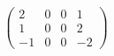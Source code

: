 \documentclass{mc2013}
\newcommand\bs{\boldsymbol}
\newcommand\tf{\varphi}
\renewcommand{\(}{\left(}
\renewcommand{\)}{\right)}
\renewcommand{\[}{\left[}
\renewcommand{\]}{\right]}
\begin{document}
\begin{itemize}
\begin{equation}
\begin{split}
\begin{pmatrix}
2 & 0 & 0 & 1 \\
1 & 0 & 0 & 2 \\
-1 & 0 & 0 & -2
\end{pmatrix}
\end{split}
\end{equation}

\end{itemize}
\end{document}
